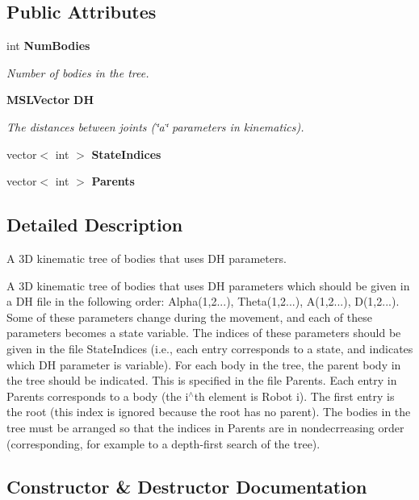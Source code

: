 \subsection*{Public Attributes}
\begin{CompactItemize}
\item 
int {\bf Num\-Bodies}
\begin{CompactList}\small\item\em Number of bodies in the tree.\item\end{CompactList}\item 
{\bf MSLVector} {\bf DH}
\begin{CompactList}\small\item\em The distances between joints (\char`\"{}a\char`\"{} parameters in kinematics).\item\end{CompactList}\item 
vector$<$ int $>$ {\bf State\-Indices}
\item 
vector$<$ int $>$ {\bf Parents}
\end{CompactItemize}


\subsection{Detailed Description}
A 3D kinematic tree of bodies that uses DH parameters.

A 3D kinematic tree of bodies that uses DH parameters which should be given in a DH file in the following order: Alpha(1,2...), Theta(1,2...), A(1,2...), D(1,2...). Some of these parameters change during the movement, and each of these parameters becomes a state variable. The indices of these parameters should be given in the file State\-Indices (i.e., each entry corresponds to a state, and indicates which DH parameter is variable). For each body in the tree, the parent body in the tree should be indicated. This is specified in the file Parents. Each entry in Parents corresponds to a body (the i$^\wedge$th element is Robot i). The first entry is the root (this index is ignored because the root has no parent). The bodies in the tree must be arranged so that the indices in Parents are in nondecrreasing order (corresponding, for example to a depth-first search of the tree). 



\subsection{Constructor \& Destructor Documentation}
